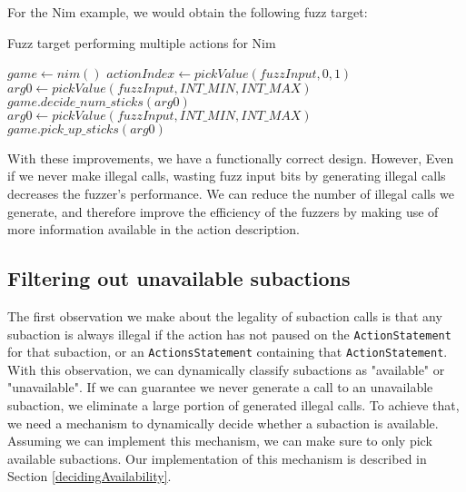 For the Nim example, we would obtain the following fuzz target:
\begin{algorithm}[H]
    \caption{Fuzz target performing multiple actions for Nim}
    \begin{algorithmic}[1]
    \STATE $game \gets nim()$
        \STATE $actionIndex \gets pickValue(fuzzInput, 0, 1)$
            \STATE $arg0 \gets pickValue(fuzzInput, INT\_MIN, INT\_MAX)$
                \STATE $game.decide\_num\_sticks(arg0)$
            \ENDIF
        \ENDIF
            \STATE $arg0 \gets pickValue(fuzzInput, INT\_MIN, INT\_MAX)$
                \STATE $game.pick\_up\_sticks(arg0)$
            \ENDIF
        \ENDIF
    \ENDWHILE
    \end{algorithmic}
\end{algorithm}

With these improvements, we have a functionally correct design.
However, Even if we never make illegal calls, wasting fuzz input bits by generating illegal calls decreases the fuzzer's performance.
We can reduce the number of illegal calls we generate, and therefore improve the efficiency of the fuzzers by making use of more information available in the action description.

\subsection{Filtering out unavailable subactions}\label{filteringUnavailableSubactions}
The first observation we make about the legality of subaction calls is that any subaction is always illegal if the action has not paused on the \texttt{ActionStatement} for that subaction, or an \texttt{ActionsStatement} containing that \texttt{ActionStatement}.
With this observation, we can dynamically classify subactions as "available" or "unavailable".
If we can guarantee we never generate a call to an unavailable subaction, we eliminate a large portion of generated illegal calls.
To achieve that, we need a mechanism to dynamically decide whether a subaction is available.
Assuming we can implement this mechanism, we can make sure to only pick available subactions.
Our implementation of this mechanism is described in Section \ref{decidingAvailability}.

